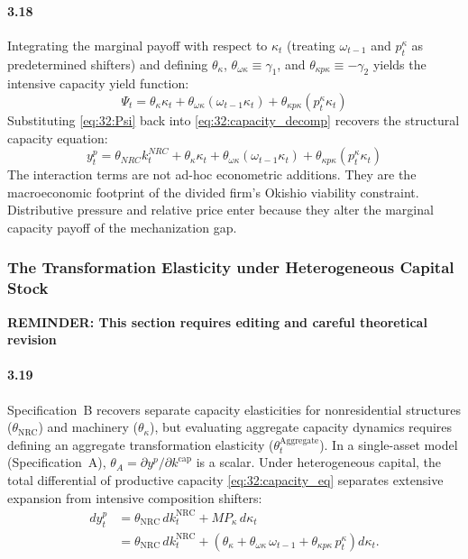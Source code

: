 \paragraph{3.18}
Integrating the marginal payoff with respect to $\kappa_t$
(treating $\omega_{t-1}$ and $p^\kappa_t$ as predetermined
shifters) and defining $\theta_\kappa$,
$\theta_{\omega\kappa} \equiv \gamma_1$, and
$\theta_{\kappa p\kappa} \equiv -\gamma_2$ yields the
intensive capacity yield function:
\begin{equation}
	\Psi_t = \theta_\kappa \kappa_t
	+ \theta_{\omega\kappa} (\omega_{t-1} \kappa_t)
	+ \theta_{\kappa p\kappa} (p^\kappa_t \kappa_t)
	\label{eq:32:Psi}
\end{equation}
Substituting \eqref{eq:32:Psi} back into
\eqref{eq:32:capacity_decomp} recovers the structural
capacity equation:
\begin{equation}
	y^p_t = \theta_{NRC} k^{NRC}_t + \theta_\kappa \kappa_t
	+ \theta_{\omega\kappa} (\omega_{t-1} \kappa_t)
	+ \theta_{\kappa p\kappa} (p^\kappa_t \kappa_t)
	\label{eq:32:capacity_eq}
\end{equation}
The interaction terms are not ad-hoc econometric additions.
They are the macroeconomic footprint of the divided firm's
Okishio viability constraint. Distributive pressure and
relative price enter because they alter the marginal
capacity payoff of the mechanization gap.

\subsubsection{The Transformation Elasticity under Heterogeneous Capital Stock}

\textbf{REMINDER: This section requires editing and careful theoretical revision}

\paragraph{3.19}
Specification~B recovers separate capacity elasticities for nonresidential structures ($\theta_{\text{NRC}}$) and machinery ($\theta_\kappa$), but evaluating aggregate capacity dynamics requires defining an aggregate transformation elasticity ($\theta^{\text{Aggregate}}_t$). In a single-asset model (Specification~A), $\theta_A = \partial y^p / \partial k^{\text{cap}}$ is a scalar. Under heterogeneous capital, the total differential of productive capacity \eqref{eq:32:capacity_eq} separates extensive expansion from intensive composition shifters:
\begin{align}
	dy^p_t &= \theta_{\text{NRC}}\, dk^{\text{NRC}}_t + MP_\kappa\, d\kappa_t
	\label{eq:32:dy_total} \\
	&= \theta_{\text{NRC}}\, dk^{\text{NRC}}_t
	+ \left(\theta_\kappa + \theta_{\omega\kappa}\, \omega_{t-1}
	+ \theta_{\kappa p\kappa}\, p^\kappa_t\right) d\kappa_t.
	\label{eq:32:dy_expanded}
\end{align}

